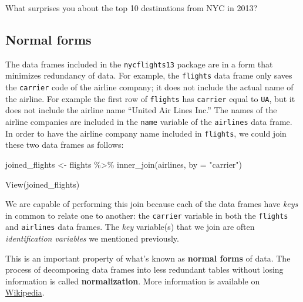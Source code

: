\documentclass[
  letterpaper,
  DIV=11,
  numbers=noendperiod]{scrreprt}
\newenvironment{Shaded}{\begin{snugshade}}{\end{snugshade}}
\newcommand{\AttributeTok}[1]{\textcolor[rgb]{0.40,0.45,0.13}{#1}}
\newcommand{\FunctionTok}[1]{\textcolor[rgb]{0.28,0.35,0.67}{#1}}
\newcommand{\NormalTok}[1]{\textcolor[rgb]{0.00,0.23,0.31}{#1}}
\newcommand{\OtherTok}[1]{\textcolor[rgb]{0.00,0.23,0.31}{#1}}
\newcommand{\SpecialCharTok}[1]{\textcolor[rgb]{0.37,0.37,0.37}{#1}}
\newcommand{\StringTok}[1]{\textcolor[rgb]{0.13,0.47,0.30}{#1}}
\theoremstyle{definition}
\theoremstyle{remark}
\begin{document}
\begin{tcolorbox}[enhanced jigsaw, colback=white, toprule=.15mm, bottomrule=.15mm, titlerule=0mm, title={{🎯} Learning Check 3.14}, leftrule=.75mm, arc=.35mm, left=2mm, colframe=quarto-callout-tip-color-frame, coltitle=black, opacitybacktitle=0.6, bottomtitle=1mm, colbacktitle=quarto-callout-tip-color!10!white, opacityback=0, toptitle=1mm, rightrule=.15mm, breakable]

What surprises you about the top 10 destinations from NYC in 2013?

\end{tcolorbox}

\hypertarget{normal-forms}{%
\subsection{Normal forms}\label{normal-forms}}

The data frames included in the \texttt{nycflights13} package are in a
form that minimizes redundancy of data. For example, the
\texttt{flights} data frame only saves the \texttt{carrier} code of the
airline company; it does not include the actual name of the airline. For
example the first row of \texttt{flights} has \texttt{carrier} equal to
\texttt{UA}, but it does not include the airline name ``United Air Lines
Inc.'' The names of the airline companies are included in the
\texttt{name} variable of the \texttt{airlines} data frame. In order to
have the airline company name included in \texttt{flights}, we could
join these two data frames as follows:

\begin{Shaded}
\begin{Highlighting}[]
\NormalTok{joined\_flights }\OtherTok{\textless{}{-}}\NormalTok{ flights }\SpecialCharTok{\%\textgreater{}\%} 
  \FunctionTok{inner\_join}\NormalTok{(airlines, }\AttributeTok{by =} \StringTok{"carrier"}\NormalTok{)}

\FunctionTok{View}\NormalTok{(joined\_flights)}
\end{Highlighting}
\end{Shaded}

We are capable of performing this join because each of the data frames
have \emph{keys} in common to relate one to another: the
\texttt{carrier} variable in both the \texttt{flights} and
\texttt{airlines} data frames. The \emph{key} variable(s) that we join
are often \emph{identification variables} we mentioned previously.

This is an important property of what's known as \textbf{normal forms}
of data. The process of decomposing data frames into less redundant
tables without losing information is called \textbf{normalization}. More
information is available on
\href{https://en.wikipedia.org/wiki/Database_normalization}{Wikipedia}.
\end{document}
